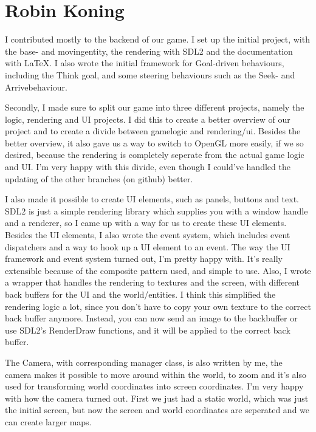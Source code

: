 \section{Robin Koning}

I contributed mostly to the backend of our game. I set up the initial 
project, with the base- and movingentity, the rendering with SDL2 and the 
documentation with \LaTeX. I also wrote the initial framework for 
Goal-driven behaviours, including the Think goal, and some steering 
behaviours such as the Seek- and Arrivebehaviour. 

Secondly, I made sure to split our game into three different projects, 
namely the logic, rendering and UI projects. I did this to create a better 
overview of our project and to create a divide between gamelogic and 
rendering/ui. Besides the better overview, it also gave us a way to switch to 
OpenGL more easily, if we so desired, because the rendering is completely 
seperate from the actual game logic and UI. I'm very happy with this divide, 
even though I could've handled the updating of the other branches (on github) 
better.

I also made it possible to create UI elements, such as panels, buttons and 
text. SDL2 is just a simple rendering library which supplies 
you with a window handle and a renderer, so I came up with a way for us to 
create these UI elements. Besides the UI elements, I also wrote the event 
system, which includes event dispatchers and a way to hook up a UI element 
to an event. The way the UI framework and event system turned out, I'm pretty 
happy with. It's really extensible because of the composite pattern used, and 
simple to use.
Also, I wrote a wrapper that handles the rendering to textures and the 
screen, with different back buffers for the UI and the world/entities. I 
think this simplified the rendering logic a lot, since you don't have to copy 
your own texture to the correct back buffer anymore. Instead, you can now 
send an image to the backbuffer or use SDL2's RenderDraw functions, and 
it will be applied to the correct back buffer.

The Camera, with corresponding manager class, is also written by me, the 
camera makes it possible to move around within the world, to zoom and it's 
also used for transforming world coordinates into screen coordinates. I'm 
very happy with how the camera turned out. First we just had a static world, 
which was just the initial screen, but now the screen and world coordinates 
are seperated and we can create larger maps.

